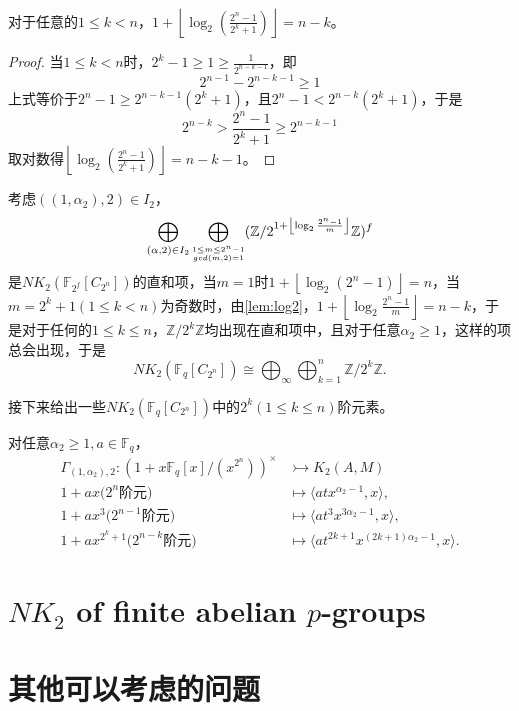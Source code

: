 \begin{lemma}
\label{lem:log2}
	对于任意的$1\leq k < n$，$1+\left \lfloor \log_2(\frac{2^n-1}{2^k+1}) \right \rfloor = n-k$。
\end{lemma}
\begin{proof}
	当$1\leq k < n$时，$2^k-1\geq 1 \geq \frac{1}{2^{n-k-1}}$，即
	\[2^{n-1}-2^{n-k-1}\geq 1 \]
	上式等价于$2^n-1\geq 2^{n-k-1}(2^k+1)$，且$2^n-1<2^{n-k}(2^k+1)$，于是
	\[2^{n-k}> \frac{2^n-1}{2^k+1} \geq 2^{n-k-1}\]
	取对数得$\left \lfloor \log_2(\frac{2^n-1}{2^k+1}) \right \rfloor = n-k-1$。
\end{proof}
考虑$((1,\alpha_2),2)\in I_2$，
$$\bigoplus_{(\alpha,2)\in I_2}\bigoplus_{\scriptsize\substack{1\leq m\leq  2^n-1 \\ gcd(m,2)=1 }}(\mathbb{Z}/2^{1+ \left \lfloor\log_2 \frac{2^n-1}{m}  \right \rfloor}\mathbb{Z})^f$$
是$NK_2(\mathbb{F}_{2^f}[C_{2^n}])$的直和项，当$m=1$时$1+ \left \lfloor\log_2 (2^n-1)\right \rfloor=n$，当$m=2^k+1 (1\leq k < n)$为奇数时，由\ref{lem:log2}，$1+ \left \lfloor\log_2 \frac{2^n-1}{m}\right \rfloor=n-k$，于是对于任何的$1\leq k\leq n$，$\mathbb{Z}/2^k\mathbb{Z}$均出现在直和项中，且对于任意$\alpha_2\geq 1$，这样的项总会出现，于是
\[NK_2(\mathbb{F}_q[C_{2^n}])\cong \bigoplus_\infty \bigoplus_{k=1}^n \mathbb{Z}/2^k\mathbb{Z}.\]

接下来给出一些$NK_2(\mathbb{F}_q[C_{2^n}])$中的$2^k(1\leq k \leq n)$阶元素。

对任意$\alpha_2\geq 1, a\in \mathbb{F}_q$，
  \begin{align*}
 \Gamma_{(1,\alpha_2),2} \colon (1+x \mathbb{F}_q[x]/(x^{2^n}))^{\times} &\rightarrowtail K_2(A,M)\\
 1+ax \text{($2^n$阶元)} &\mapsto \langle atx^{\alpha_2-1},x \rangle,\\
 1+ax^3 \text{($2^{n-1}$阶元)} &\mapsto \langle at^3x^{3\alpha_2-1},x \rangle,\\
 1+ax^{2^k+1} \text{($2^{n-k}$阶元)} &\mapsto \langle at^{2k+1}x^{(2k+1)\alpha_2-1},x \rangle.
 \end{align*}






% 

\section{$NK_2$ of finite abelian $p$-groups}


\section{其他可以考虑的问题}

